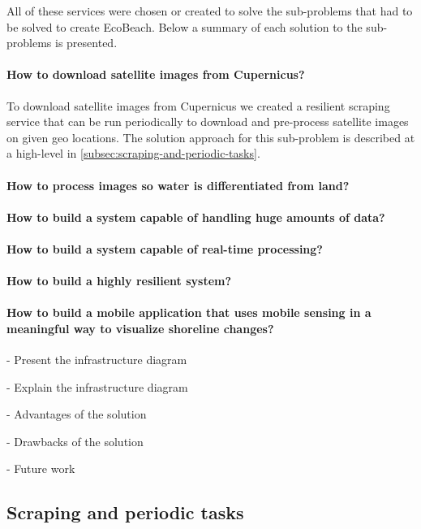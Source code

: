 All of these services were chosen or created to solve the sub-problems that had to be solved to create EcoBeach. Below a summary of each solution to the sub-problems is presented.

\paragraph{How to download satellite images from Cupernicus?} To download satellite images from Cupernicus we created a resilient scraping service that can be run periodically to download and pre-process satellite images on given geo locations. The solution approach for this sub-problem is described at a high-level in \autoref{subsec:scraping-and-periodic-tasks}.
\paragraph{How to process images so water is differentiated from land?}
\paragraph{How to build a system capable of handling huge amounts of data?}
\paragraph{How to build a system capable of real-time processing?}
\paragraph{How to build a highly resilient system?}
\paragraph{How to build a mobile application that uses mobile sensing in a meaningful way to visualize shoreline changes?}

- Present the infrastructure diagram

- Explain the infrastructure diagram

- Advantages of the solution

- Drawbacks of the solution

- Future work










\subsection{Scraping and periodic tasks} \label{subsec:scraping-and-periodic-tasks}

